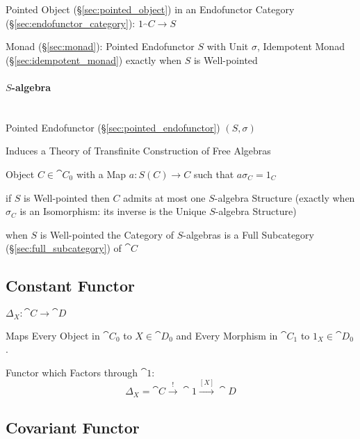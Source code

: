 Pointed Object (\S\ref{sec:pointed_object}) in an Endofunctor Category
(\S\ref{sec:endofunctor_category}): $1_\cat{C} \rightarrow S$

Monad (\S\ref{sec:monad}): Pointed Endofunctor $S$ with Unit $\sigma$,
Idempotent Monad (\S\ref{sec:idempotent_monad}) exactly when $S$ is
Well-pointed



\paragraph{$S$-algebra}\label{sec:s_algebra}
\hfill \\

Pointed Endofunctor (\S\ref{sec:pointed_endofunctor}) $(S, \sigma)$

Induces a Theory of Transfinite Construction of Free Algebras

Object $C \in \cat{C}_0$ with a Map $a : S(C) \rightarrow C$ such that
$a \sigma_C = 1_C$

if $S$ is Well-pointed then $C$ admits at most one $S$-algebra
Structure (exactly when $\sigma_C$ is an Isomorphism: its inverse is
the Unique $S$-algebra Structure)

when $S$ is Well-pointed the Category of $S$-algebras is a Full
Subcategory (\S\ref{sec:full_subcategory}) of $\cat{C}$



\subsection{Constant Functor}\label{sec:constant_functor}

$\Delta_X : \cat{C} \rightarrow \cat{D}$

Maps Every Object in $\cat{C}_0$ to $X \in \cat{D}_0$ and Every
Morphism in $\cat{C}_1$ to $1_X \in \cat{D}_0$.

Functor which Factors through $\cat{1}$:
\[
  \Delta_X = \cat{C} \xrightarrow{\;\;!\;\;} \cat{1}
    \xrightarrow{[X]} \cat{D}
\]



\subsection{Covariant Functor} \label{sec:covariant_functor}

